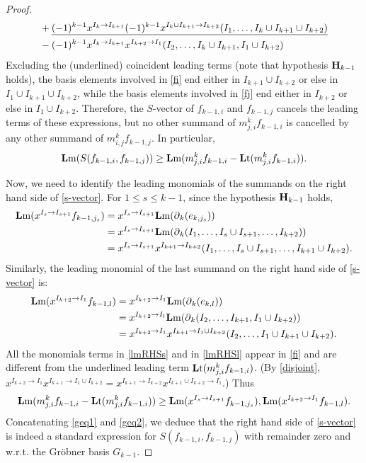 \documentclass[ALCO]{cedram}
\newcommand{\lm}{\mbox{${\bf L}{\rm m}$}}
\newcommand{\lt}{\mbox{${\bf L}{\rm t}$}}
\newcommand{\mbfh}{\mbox{${\bf H}$}}
\newcommand{\dif}{\mbox{$\partial$}}
\begin{document}
\begin{proof}
\begin{align}
&+ \underline{(-1)^{k-1}x^{I_{k}\to
      I_{k+1}}(-1)^{k-1}x^{I_{k}\cup I_{k+1}\to I_{k+2}}(I_1,\ldots
    ,I_{k}\cup I_{k+1}\cup I_{k+2})} \notag \\
  &-(-1)^{k-1}x^{I_{k}\to I_{k+1}}x^{I_{k+2}\to
    I_1}(I_2,\ldots,I_{k}\cup I_{k+1},I_1\cup I_{k+2})\notag
\end{align}
Excluding the (underlined) coincident leading terms (note that
hypothesis $\mbfh_{k-1}$ holds), the basis elements involved in
\eqref{fi} end either in $I_{k+1}\cup I_{k+2}$ or else in $I_1\cup I_{k+1}\cup
I_{k+2}$, while the basis elements involved in \eqref{fj} end either
in $I_{k+2}$ or else in $I_1\cup I_{k+2}$. Therefore, the $S$-vector
of $f_{k-1,i}$ and $f_{k-1,j}$ cancels the leading terms of these
expressions, but no other summand of $m^{k}_{j,i}f_{k-1,i}$ is
cancelled by any other summand of $m^{k}_{i,j}f_{k-1,j}$.  In
particular,
\begin{eqnarray}\label{geq1}
\lm(S(f_{k-1,i},f_{k-1,j}))\geq
\lm(m^{k}_{j,i}f_{k-1,i}-\lt(m^{k}_{j,i}f_{k-1,i})).
\end{eqnarray}

Now, we need to identify the leading monomials of the summands on the
right hand side of \eqref{s-vector}. For $1\leq s\leq k-1$, since the
hypothesis $\mbfh_{k-1}$ holds,
\begin{align}\label{lmRHSs}
\lm(x^{I_s\to I_{s+1}}f_{k-1,j_s})&=x^{I_s\to
    I_{s+1}}\lm(\dif_{k}(e_{k,j_s}))\\
&= x^{I_s\to  I_{s+1}}\lm(\dif_{k}(I_1,\ldots ,I_s\cup I_{s+1},\ldots
  ,I_{k+2}))\notag \\ 
&= x^{I_s\to I_{s+1}}x^{I_{k+1}\to I_{k+2}}
  (I_1,\ldots ,I_s\cup I_{s+1},\ldots ,I_{k+1}\cup I_{k+2}). \notag
\end{align}
Similarly, the leading monomial of the last summand on the right hand
side of \eqref{s-vector} is:
\begin{align}\label{lmRHSl}
\lm(x^{I_{k+2}\to I_{1}}f_{k-1,l})&=x^{I_{k+2}\to
    I_{1}}\lm(\dif_{k}(e_{k,l}))\\
&= x^{I_{k+2}\to     I_{l}}\lm(\dif_{k}(I_2,\ldots ,I_{k+1}, I_{1}\cup I_{k+2}))
  \notag \\
&= x^{I_{k+2}\to I_{1}}x^{I_{k+1}\to I_1\cup I_{k+2}}
  (I_2,\ldots ,I_1\cup I_{k+1}\cup I_{k+2}). \notag
\end{align}
All the monomials terms in \eqref{lmRHSs} and in \eqref{lmRHSl} appear
in \eqref{fi} and are different from the underlined leading term
$\lt(m^{k}_{j,i}f_{k-1,i})$. (By \eqref{disjoint}, $x^{I_{k+2}\to
  I_1}x^{I_{k+1}\to I_1\cup I_{k+2}}=x^{I_{k+1}\to
  I_{k+2}}x^{I_{k+1}\cup I_{k+2}\to I_1}$.)  Thus
\begin{equation}\label{geq2}
\lm(m^{k}_{j,i}f_{k-1,i}-\lt(m^{k}_{j,i}f_{k-1,i}))\geq\lm(x^{I_s\to I_{s+1}}f_{k-1,j_s}),\lm(x^{I_{k+2}\to I_{1}}f_{k-1,l}).
\end{equation}
Concatenating \eqref{geq1} and \eqref{geq2}, we deduce that the right
hand side of \eqref{s-vector} is indeed a standard expression for
$S(f_{k-1,i},f_{k-1,j})$ with remainder zero and w.r.t. the Gr\"obner
basis $G_{k-1}$.


\end{proof}
\end{document}
